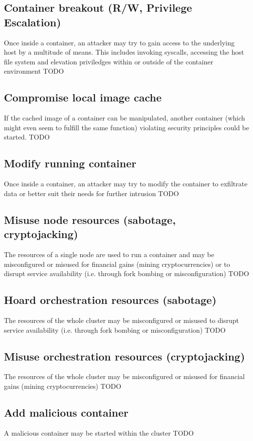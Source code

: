 \subsection{Container breakout (R/W, Privilege Escalation)}
Once inside a container, an attacker may try to gain access to the underlying host by a multitude of means. This includes invoking syscalls, accessing the host file system and elevation priviledges within or outside of the container environment
TODO

\subsection{Compromise local image cache}
If the cached image of a container can be manipulated, another container (which might even seem to fulfill the same function) violating security principles could be started.
TODO

\subsection{Modify running container}
Once inside a container, an attacker may try to modify the container to exfiltrate data or better suit their needs for further intrusion
TODO

\subsection{Misuse node resources (sabotage, cryptojacking)}
The resources of a single node are used to run a container and may be misconfigured or misused for financial gains (mining cryptocurrencies) or to disrupt service availability (i.e. through fork bombing or misconfiguration)
TODO

\subsection{Hoard orchestration resources (sabotage)}
The resources of the whole cluster may be misconfigured or misused to disrupt service availability (i.e. through fork bombing or misconfiguration)
TODO

\subsection{Misuse orchestration resources (cryptojacking)}
The resources of the whole cluster may be misconfigured or misused for financial gains (mining cryptocurrencies)
TODO

\subsection{Add malicious container}
A malicious container may be started within the cluster
TODO

